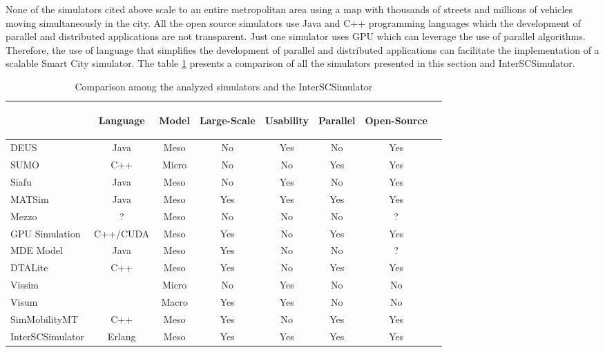 None of the simulators cited above scale to an entire metropolitan area using a map with thousands of streets and millions of vehicles moving simultaneously in the city. All the open source simulators use Java and C++  programming languages which the development of parallel and distributed applications are not transparent. Just one simulator \cite{song2017gpusimulation} uses GPU which can leverage the use of parallel algorithms. Therefore, the use of language that simplifies the development of parallel and distributed applications can facilitate the implementation of a scalable Smart City simulator. The table \ref{table:comparacao_simuladores} presents a comparison of all the simulators presented in this section and InterSCSimulator.

\begin{table}[!htb]
\centering
{%
\begin{tabular}{|l|c|c|c|c|c|c|c|}
\hline

& \begin{sideways}Language \end{sideways} 
& \begin{sideways}Model \end{sideways} 
& \begin{sideways}Large-Scale \end{sideways} 
& \begin{sideways}Usability \end{sideways} 
& \begin{sideways}Parallel \end{sideways} 
& \begin{sideways}Open-Source \hspace{1cm}\end{sideways} 
\\
\hline
DEUS
& Java & Meso & No & Yes & No & Yes\\
SUMO
& C++ & Micro & No & No & Yes & Yes \\
Siafu
& Java & Meso & No & Yes & No & Yes\\
MATSim
& Java & Meso & Yes & Yes & Yes  & Yes \\
Mezzo
& ? & Meso & No & No & No  & ? \\
GPU Simulation
& C++/CUDA & Meso & Yes & No & Yes  & Yes \\
MDE Model
& Java & Meso & Yes & No & No  & ? \\
DTALite
& C++ & Meso & Yes & No & Yes  & Yes \\
Vissim
&  & Micro & No & Yes & No & No \\
Visum
&  & Macro & Yes & Yes & No  & No \\
SimMobilityMT
& C++ & Meso & Yes & No & Yes & Yes \\
InterSCSimulator
& Erlang & Meso & Yes & Yes & Yes & Yes \\
\hline
\end{tabular}}
\caption{Comparison among the analyzed simulators and the InterSCSimulator\label{table:comparacao_simuladores}}
\end{table}%


